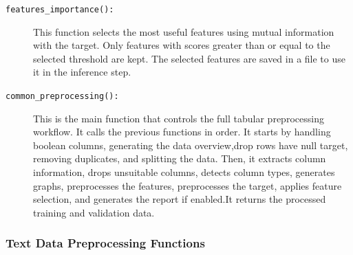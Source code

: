 \documentclass[12pt,a4paper]{report}
\begin{document}
\begin{description}
    \item[\texttt{features\_importance():}]
    This function selects the most useful features using mutual information with the target. Only features with scores
    greater than or equal to the selected threshold are kept. The selected features are
    saved in a file to use it in the inference step. 
    \item[\texttt{common\_preprocessing():}]
    This is the main function that controls the full tabular preprocessing workflow. It
    calls the previous functions in order. It starts by handling boolean columns,
    generating the data overview,drop rows have null target, removing duplicates, and splitting the data. Then, it
    extracts column information, drops unsuitable columns, detects column types,
    generates graphs, preprocesses the features, preprocesses the target, applies feature
    selection, and generates the report if enabled.It returns the processed
    training and validation data.
\end{description}

\subsubsection{Text Data Preprocessing Functions}
\end{document}
